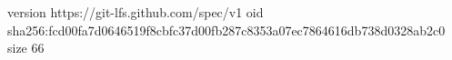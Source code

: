 version https://git-lfs.github.com/spec/v1
oid sha256:fcd00fa7d0646519f8cbfc37d00fb287c8353a07ec7864616db738d0328ab2c0
size 66
